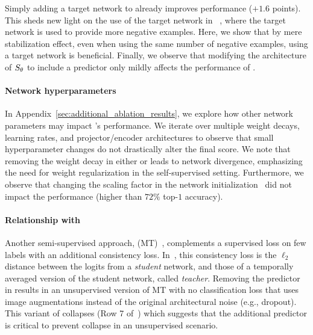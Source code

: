 Simply adding a target network to \simclr already improves performance ($+1.6$ points). This sheds new light on the use of the target network in \moco~\cite{MOCO}, where the target network is used to provide more negative examples. Here, we show that by mere stabilization effect, even when using the same number of negative examples, using a target network is beneficial. 
Finally, we observe that modifying the architecture of $S_{\theta}$ to include a predictor only mildly affects the performance of \simclr.

\paragraph{Network hyperparameters} In Appendix~\ref{sec:additional_ablation_results}, we explore how other network parameters may impact \algo's performance.
We iterate over multiple weight decays, learning rates, and projector/encoder architectures to observe that small hyperparameter changes do not drastically alter the final score. We note that removing the weight decay in either \algo or \simclr leads to network divergence, emphasizing the need for weight regularization in the self-supervised setting. Furthermore, we observe that changing the scaling factor in the network initialization~\cite{he2015delving} did not impact the performance (higher than $72\%$ top-$1$ accuracy).


\paragraph{Relationship with \meanteacher}\label{sec:mean_teacher} Another  semi-supervised approach, \meanteacher (MT)~\cite{tarvainen2017mean},  complements a supervised loss on few labels with an additional consistency loss. In~\cite{tarvainen2017mean}, this consistency loss is the $\ell_2$ distance between the logits from a \textit{student} network, and those of a temporally averaged version of the student network, called \textit{teacher}. 
Removing the predictor in \algo results in an unsupervised version of MT with no classification loss that uses image augmentations instead of the original architectural noise (e.g., dropout).
This variant of \algo collapses (Row 7 of~) which suggests that the additional predictor is critical to prevent collapse in an unsupervised scenario.


